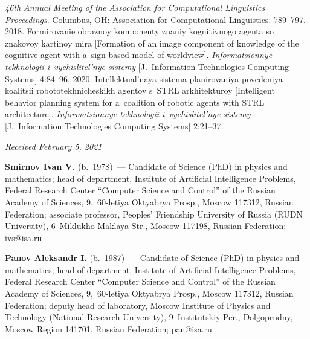 \begin{multicols}{2}
{{\begin{thebibliography}{99}
\textit{46th Annual Meeting of the Association for Computational Linguistics Proceedings}. 
Columbus, OH: Association for Computational Linguistics. 789--797.
   2018. Formirovanie obraznoy komponenty znaniy kognitivnogo agenta so 
znakovoy kartinoy mira [Formation of an image component of knowledge of the cognitive agent 
with a~sign-based model of worldview]. \textit{Informatsionnye tekhnologii i~vychislitel'nye 
sistemy} [J.~Information Technologies Computing Systems] 4:84--96.
   2020. Intellektual'naya sistema pla\-ni\-ro\-va\-niya povedeniya koalitsii 
robototekhnicheskikh agen\-tov s~STRL arkhitekturoy [Intelligent behavior planning system for 
a~coalition of robotic agents with STRL architecture]. \textit{Informatsionnye tekhnologii 
i~vychislitel'nye sistemy} [J.~Information Technologies Computing Systems] 2:21--37.
  \end{thebibliography}

 }
 }

\end{multicols}

\vspace*{-6pt}

\hfill{\small\textit{Received February 5, 2021}}



  
  \Contr
  
  \noindent
  \textbf{Smirnov Ivan V.} (b.\ 1978)~--- Candidate of Science (PhD) in physics and 
mathematics; head of department, Institute of Artificial Intelligence Problems, Federal Research 
Center ``Computer Science and Control'' of the Russian Academy of Sciences, 9,~60-letiya 
Oktyabrya Prosp., Moscow 117312, Russian Federation; associate professor, Peoples' Friendship 
University of Russia (RUDN University), 6~Miklukho-Maklaya Str., Moscow 117198, Russian 
Federation; \mbox{ivs@isa.ru}
  
  \vspace*{3pt}
  
  \noindent
  \textbf{Panov Aleksandr I.} (b.\ 1987)~--- Candidate of Science (PhD) in physics and 
mathematics; head of department, Institute of Artificial Intelligence Problems, Federal Research 
Center ``Computer Science and Control'' of the Russian Academy of Sciences, 9,~60-letiya 
Oktyabrya Prosp., Moscow 117312, Russian Federation; deputy head of laboratory, Moscow 
Institute of Physics and Technology (National Research University), 9~Institutskiy Per., 
Dolgoprudny, Moscow Region 141701, Russian Federation; \mbox{pan@isa.ru}
  
